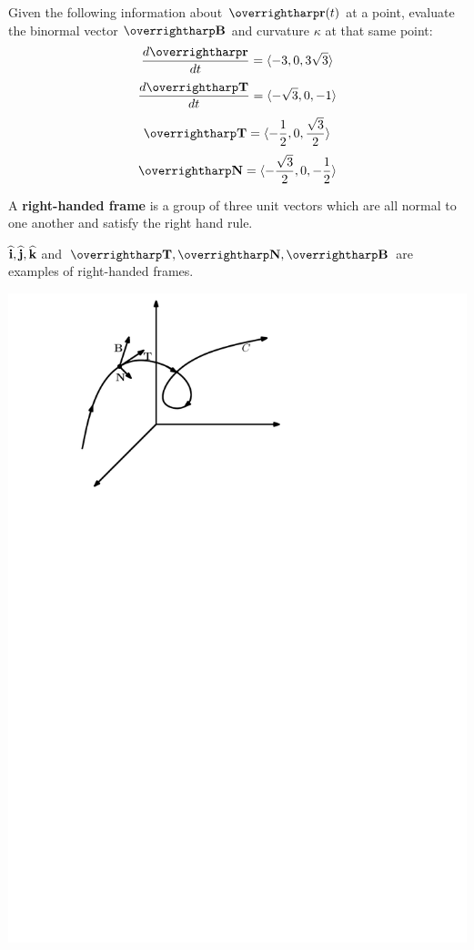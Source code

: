 \documentclass[letterpaper, twoside, 12pt]{book}
\begin{document}
          \begin{solution}

          \end{solution}

          \begin{problem}
          Given the following information about $\vect{r}(t)$ at a point,
          evaluate the binormal vector $\vect{B}$ and curvature
          $\kappa$ at that same point:
            \[\frac{d\vect{r}}{dt}=\<-3,0,3\sqrt{3}\>\]
            \[\frac{d\vect{T}}{dt}=\<-\sqrt{3},0,-1\>\]
            \[\vect{T}=\<-\frac{1}{2},0,\frac{\sqrt{3}}{2}\>\]
            \[\vect{N}=\<-\frac{\sqrt{3}}{2},0,-\frac{1}{2}\>\]
          \end{problem}

          \begin{solution}

          \end{solution}

\begin{definition}
  A \textbf{right-handed frame} is a group of three unit vectors which
  are all normal to one another and satisfy the right hand rule.
\end{definition}

\begin{example}
  $\mathbf{\widehat{i}},\mathbf{\widehat{j}},\mathbf{\widehat{k}}$ and $\vect T,\vect N,\vect B$ are examples
  of right-handed frames.
\end{example}

\begin{center}
\includegraphics[width=0.5\linewidth]{assets/tnb.pdf}
\end{center}
\end{document}

